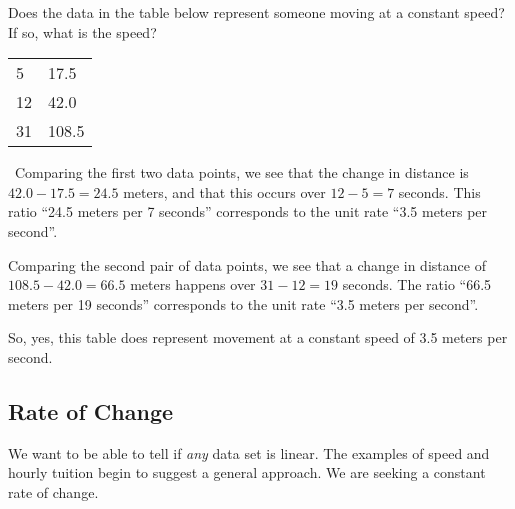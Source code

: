 
\begin{boxedex}
Does the data in the table below represent someone moving at a constant speed? If so, what is the speed?

\begin{center}
\begin{tabular}{|C{2cm}|C{2cm}|}
\hline
{} & \\ & 17.5\\
12 & 42.0\\
31 & 108.5\\\hline
\end{tabular}
\end{center}

\exsoln\ Comparing the first two data points, we see that the change in distance is $42.0 - 17.5 = 24.5$ meters, and that this occurs over $12-5=7$ seconds. This ratio ``24.5 meters per 7 seconds'' corresponds to the unit rate ``3.5 meters per second''.

Comparing the second pair of data points, we see that a change in distance of $108.5-42.0 = 66.5$ meters happens over $31-12 = 19$ seconds. The ratio ``66.5 meters per 19 seconds'' corresponds to the unit rate ``3.5 meters per second''.

So, yes, this table does represent movement at a constant speed of 3.5 meters per second.
\end{boxedex}


\subsection{Rate of Change}

We want to be able to tell if \textit{any} data set is linear. The examples of speed and hourly tuition begin to suggest a general approach. We are seeking a constant \gls{rate of change}.


